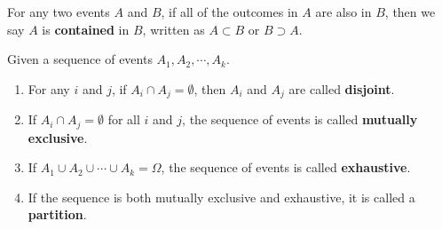 \documentclass{huhtakm-template-book}
\begin{document}
\begin{sdefn}
	For any two events $A$ and $B$, if all of the outcomes in $A$ are also in $B$, then we say $A$ is \textbf{contained} in $B$, written as $A\subset B$ or $B\supset A$.
\end{sdefn}
\begin{sdefn}
	Given a sequence of events $A_{1},A_{2},\cdots,A_{k}$.
	\begin{enumerate}
		\item For any $i$ and $j$, if $A_{i}\cap A_{j}=\emptyset$, then $A_{i}$ and $A_{j}$ are called \textbf{disjoint}.
		\item If $A_{i}\cap A_{j}=\emptyset$ for all $i$ and $j$, the sequence of events is called \textbf{mutually exclusive}.
		\item If $A_{1}\cup A_{2}\cup\cdots\cup A_{k}=\Omega$, the sequence of events is called \textbf{exhaustive}.
		\item If the sequence is both mutually exclusive and exhaustive, it is called a \textbf{partition}.
	\end{enumerate}
\end{sdefn}
\end{document}
